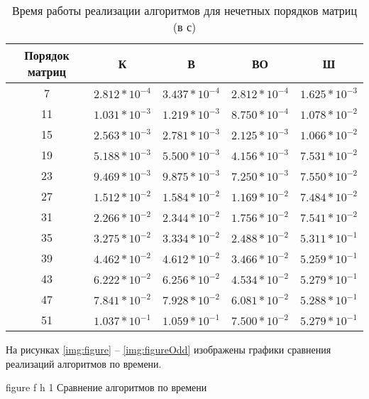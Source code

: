 \begin{table}[h]
	\begin{center}
		\begin{threeparttable}
			\captionsetup{justification=raggedright,singlelinecheck=off}
			\caption{Время работы реализации алгоритмов для нечетных порядков матриц (в с)}
			\label{tbl:time_measurements_odd}
			\begin{tabular}{|c|c|c|c|c|}
				\hline
				Порядок матриц &  К  & В & ВО & Ш \\
				\hline
			7 &$ 2.812* 10^{-4} $&$ 3.437* 10^{-4} $&$ 2.812* 10^{-4} $&$ 1.625* 10^{-3}$\\
			\hline
			11 &$ 1.031* 10^{-3} $&$ 1.219* 10^{-3} $&$ 8.750* 10^{-4} $&$ 1.078* 10^{-2}$\\
			\hline
			15 &$ 2.563* 10^{-3} $&$ 2.781* 10^{-3} $&$ 2.125* 10^{-3} $&$ 1.066* 10^{-2}$\\
			\hline
			19 &$ 5.188* 10^{-3} $&$ 5.500* 10^{-3} $&$ 4.156* 10^{-3} $&$ 7.531* 10^{-2}$\\
			\hline
			23 &$ 9.469* 10^{-3} $&$ 9.875* 10^{-3} $&$ 7.250* 10^{-3} $&$ 7.550* 10^{-2}$\\
			\hline
			27 &$ 1.512* 10^{-2} $&$ 1.584* 10^{-2} $&$ 1.169* 10^{-2} $&$ 7.484* 10^{-2}$\\
			\hline
			31 &$ 2.266* 10^{-2} $&$ 2.344* 10^{-2} $&$ 1.756* 10^{-2} $&$ 7.541* 10^{-2}$\\
			\hline
			35 &$ 3.275* 10^{-2} $&$ 3.334* 10^{-2} $&$ 2.488* 10^{-2} $&$ 5.311* 10^{-1}$\\
			\hline
			39 &$ 4.462* 10^{-2} $&$ 4.612* 10^{-2} $&$ 3.466* 10^{-2} $&$ 5.259* 10^{-1}$\\
			\hline
			43 &$ 6.222* 10^{-2} $&$ 6.256* 10^{-2} $&$ 4.534* 10^{-2} $&$ 5.279* 10^{-1}$\\
			\hline
			47 &$ 7.841* 10^{-2} $&$ 7.928* 10^{-2} $&$ 6.081* 10^{-2} $&$ 5.288* 10^{-1}$\\
			\hline
			51 &$ 1.037* 10^{-1} $&$ 1.059* 10^{-1} $&$ 7.500* 10^{-2} $&$ 5.279* 10^{-1}$\\
			\hline
			\end{tabular}
		\end{threeparttable}
	\end{center}
\end{table}

На рисунках \ref{img:figure} -- \ref{img:figureOdd} изображены графики сравнения реализаций алгоритмов по времени.

{figure} %
{f} %
{h} %
{1\textwidth} %
{Сравнение алгоритмов по времени} %

